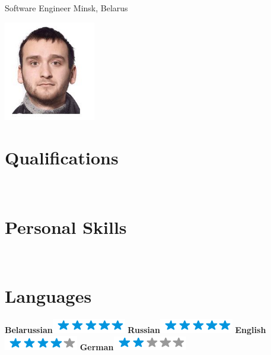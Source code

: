 \documentclass[]{friggeri-cv}
\begin{document}
      {Software Engineer}
      {Minsk, Belarus}
      

\begin{aside}
  \includegraphics[width=4cm]{img/Artsiom_Kaltovich.jpg}
    ~
  \section{Qualifications}
    ~
  \section{Personal Skills}
    ~
    \section{Languages}
        \textbf{Belarussian}\includegraphics[scale=0.40]{img/5stars.png}
        \textbf{Russian}\includegraphics[scale=0.40]{img/5stars.png}
        \textbf{English}\includegraphics[scale=0.40]{img/4stars.png}
        \textbf{German}\includegraphics[scale=0.40]{img/2stars.png}
    ~

\end{aside}
\end{document}
